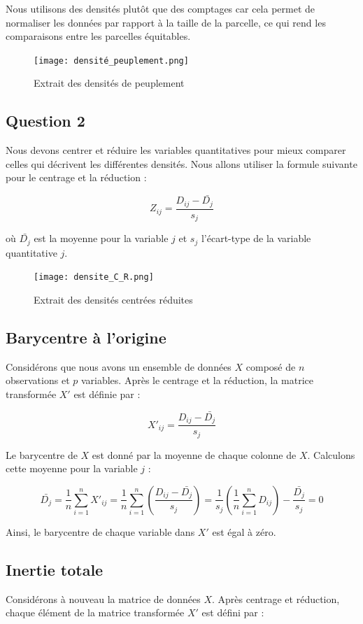 \documentclass[a4paper,12pt]{article}
\begin{document}
Nous utilisons des densités plutôt que des comptages car cela permet de normaliser les données par rapport à la taille de la parcelle, ce qui rend les comparaisons entre les parcelles équitables.

\begin{figure}[h!]
    \centering
    \texttt{[image: densité\_peuplement.png]}
    \caption{Extrait des densités de peuplement}
    \label{fig:densité_peuplement}
\end{figure}

\subsection{Question 2}
Nous devons centrer et réduire les variables quantitatives pour mieux comparer celles qui décrivent les différentes densités. Nous allons utiliser la formule suivante pour le centrage et la réduction :

\[
Z_{ij} = \frac{D_{ij} - \bar{D_{j}}}{s_{j}}
\]

où \(\bar{D_{j}}\) est la moyenne pour la variable \(j\) et \(s_{j}\) l’écart-type de la variable quantitative \(j\).

\begin{figure}[h!]
    \centering
    \texttt{[image: densite\_C\_R.png]}
    \caption{Extrait des densités centrées réduites}
    \label{fig:densité_C_R}
\end{figure}

\subsection{Barycentre à l'origine}
Considérons que nous avons un ensemble de données \(X\) composé de \(n\) observations et \(p\) variables. Après le centrage et la réduction, la matrice transformée \(X'\) est définie par :

\[
X'_{ij} = \frac{D_{ij} - \bar{D_{j}}}{s_{j}}
\]

Le barycentre de \(X\) est donné par la moyenne de chaque colonne de \(X\). Calculons cette moyenne pour la variable \(j\) :

\[
\bar{D_{j}} = \frac{1}{n} \sum_{i=1}^{n} X'_{ij} = \frac{1}{n} \sum_{i=1}^{n} \left( \frac{D_{ij} - \bar{D_{j}}}{s_{j}} \right) 
= \frac{1}{s_{j}} \left( \frac{1}{n} \sum_{i=1}^{n} D_{ij} \right) - \frac{\bar{D_{j}}}{s_{j}} = 0
\]

Ainsi, le barycentre de chaque variable dans \(X'\) est égal à zéro.

\subsection{Inertie totale}
Considérons à nouveau la matrice de données \(X\). Après centrage et réduction, chaque élément de la matrice transformée \(X'\) est défini par :
\end{document}
